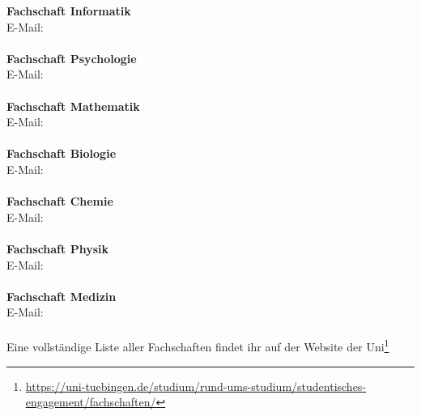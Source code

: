 \textbf{Fachschaft Informatik}\\
E-Mail: \\
\\
\textbf{Fachschaft Psychologie}\\
E-Mail: \\
\\
\textbf{Fachschaft Mathematik}\\
E-Mail: \\
\\
\textbf{Fachschaft Biologie}\\
E-Mail: \\
\\
\textbf{Fachschaft Chemie}\\
E-Mail: \\
\\
\textbf{Fachschaft Physik}\\
E-Mail: \\
\\
\textbf{Fachschaft Medizin}\\
E-Mail: \\
\\
Eine vollständige Liste aller Fachschaften findet ihr auf der Website der Uni\footnote{\url{https://uni-tuebingen.de/studium/rund-ums-studium/studentisches-engagement/fachschaften/}}	%

\vfill
